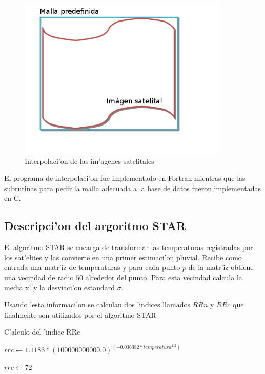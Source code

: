   \begin{figure}[h!]
  \centering
  \includegraphics[width=100mm,bb=0 0 502 388]{./imagenes/malla.jpg}
  \caption{Interpolaci'on de las im'agenes satelitales}
  \end{figure}

  El programa de interpolaci'on fue implementado en Fortran mientras que las subrutinas para 
  pedir la malla adecuada a la base de datos fueron implementadas en C.

\subsection{Descripci'on del argoritmo STAR}
  El algoritmo STAR\cite{star} se encarga de transformar las temperaturas registradas por los sat'elites y las convierte
  en una primer estimaci'on pluvial. Recibe como entrada una matr'iz de temperaturas y para cada punto $p$ de la matr'iz
  obtiene una vecindad de radio $50$ alrededor del punto. Para esta vecindad calcula la media x' y la desviaci'on estandard $\sigma$.

  Usando 'esta informaci'on se calculan dos 'indices llamados $RRn$ y $RRc$ que finalmente son utilizados por el algoritmo STAR

  \begin{algorithm}
  \caption{C'alculo del 'indice RRc}

  \begin{algorithmic}
	  \STATE $rrc \gets 1.1183* (100000000000.0)^(-0.036382*temperatura^{1.2})$
  \ELSE
	  
	  \STATE $rrc \gets 72$ 
	  
  \ENDIF 
  \end{algorithmic}
  \end{algorithm}

